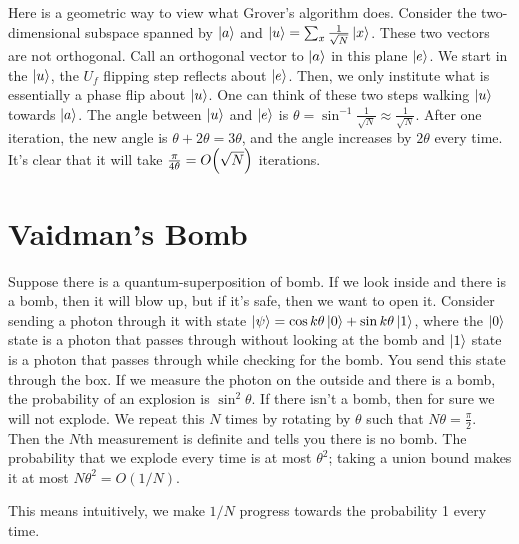 Here is a geometric way to view what Grover's algorithm does. Consider the two-dimensional subspace spanned by
$\ket{a}$ and $\ket{u} = \sum_x \frac{1}{\sqrt{N}} \ket{x}$. These two vectors are not orthogonal. Call an orthogonal
vector to $\ket{a}$ in this plane $\ket{e}$. We start in the $\ket{u}$,
the $U_f$ flipping step reflects about $\ket{e}$. Then, we only institute what is essentially a phase flip about $\ket{u}$. One
can think of these two steps walking $\ket{u}$ towards $\ket{a}$. The angle between $\ket{u}$ and $\ket{e}$ is $\theta = \sin^{-1} \frac{1}{\sqrt{N}} \approx \frac{1}{\sqrt{N}}$.
After one iteration, the new angle is $\theta + 2 \theta = 3 \theta$, and the angle increases by $2\theta$ every time. It's clear that it will take
$\frac{\pi}{4\theta} = O\qty(\sqrt{N})$ iterations.

\section{Vaidman's Bomb}
Suppose there is a quantum-superposition of bomb. If we look inside and there is a bomb, then it will blow up,
but if it's safe, then we want to open it. Consider sending a photon through it with state $\ket{\psi} = \cos k\theta \ket{0} + \sin k\theta \ket{1}$,
where the $\ket{0}$ state is a photon that passes through without looking at the bomb and $\ket{1}$ state is a photon that passes through while checking for the bomb.
You send this state through the box. If we measure the photon on the outside and there is a bomb,
the probability of an explosion is $\sin^2 \theta$. If there isn't a bomb, then for sure we will not explode. We repeat this $N$ times by rotating by $\theta$ such that $N \theta = \frac{\pi}{2}$.
Then the $N$th measurement is definite and tells you there is no bomb. The probability that we explode every time is at most $\theta^2$; taking a union
bound makes it at most $N \theta^2 = O(1/N)$.

This means intuitively, we make $1/N$ progress towards the probability 1 every time.